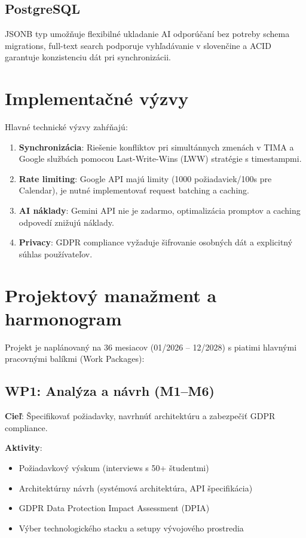 \documentclass[10pt,twocolumn,twoside,slovak,a4paper]{article}
\begin{document}
\subsection{PostgreSQL}
JSONB typ umožňuje flexibilné ukladanie AI odporúčaní bez potreby schema migrations, full-text search podporuje vyhľadávanie v slovenčine a ACID garantuje konzistenciu dát pri synchronizácii.

\section{Implementačné výzvy}

Hlavné technické výzvy zahŕňajú:

\begin{enumerate}
\item \textbf{Synchronizácia}: Riešenie konfliktov pri simultánnych zmenách v TIMA a Google službách pomocou Last-Write-Wins (LWW) stratégie s timestampmi.
\item \textbf{Rate limiting}: Google API majú limity (1000 požiadaviek/100s pre Calendar), je nutné implementovať request batching a caching.
\item \textbf{AI náklady}: Gemini API nie je zadarmo, optimalizácia promptov a caching odpovedí znižujú náklady.
\item \textbf{Privacy}: GDPR compliance vyžaduje šifrovanie osobných dát a explicitný súhlas používateľov.
\end{enumerate}

\section{Projektový manažment a harmonogram}

Projekt je naplánovaný na 36 mesiacov (01/2026 -- 12/2028) s piatimi hlavnými pracovnými balíkmi (Work Packages):

\subsection{WP1: Analýza a návrh (M1--M6)}

\textbf{Cieľ}: Špecifikovať požiadavky, navrhnúť architektúru a zabezpečiť GDPR compliance.

\textbf{Aktivity}:
\begin{itemize}
\item Požiadavkový výskum (interviews s 50+ študentmi)
\item Architektúrny návrh (systémová architektúra, API špecifikácia)
\item GDPR Data Protection Impact Assessment (DPIA)
\item Výber technologického stacku a setupy vývojového prostredia
\end{itemize}
\end{document}
